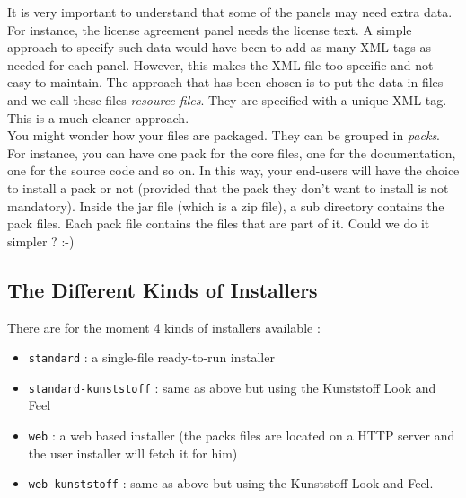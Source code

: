 It is very important to understand that some of the panels may need extra data. For
instance, the license agreement panel needs the license text. A simple approach
to specify such data would have been to add as many XML tags as needed for
each panel. However, this makes the XML file too specific and not easy to
maintain. The approach that has been chosen is to put the data in files and we
call these files \textit{resource files}. They are specified with a unique XML
tag. This is a much cleaner approach.\\

You might wonder how your files are packaged. They can be grouped in
\textit{packs}. For instance, you can have one pack for the core files, one for
the documentation, one for the source code and so on. In this way, your end-users
will have the choice to install a pack or not (provided that the pack they don't
want to install is not mandatory). Inside the jar file (which is a zip file), a
sub directory contains the pack files. Each pack file contains the files that are
part of it. Could we do it simpler ? :-)\\

\subsection{The Different Kinds of Installers}

There are for the moment 4 kinds of installers available :
\begin{itemize}

  \item \texttt{standard} : a single-file ready-to-run installer
  \item \texttt{standard-kunststoff} : same as above but using the Kunststoff
  Look and Feel
  \item \texttt{web} : a web based installer (the packs files are located on a
  HTTP server and the user installer will fetch it for him)
  \item \texttt{web-kunststoff} : same as above but using the Kunststoff
  Look and Feel.

\end{itemize}\
